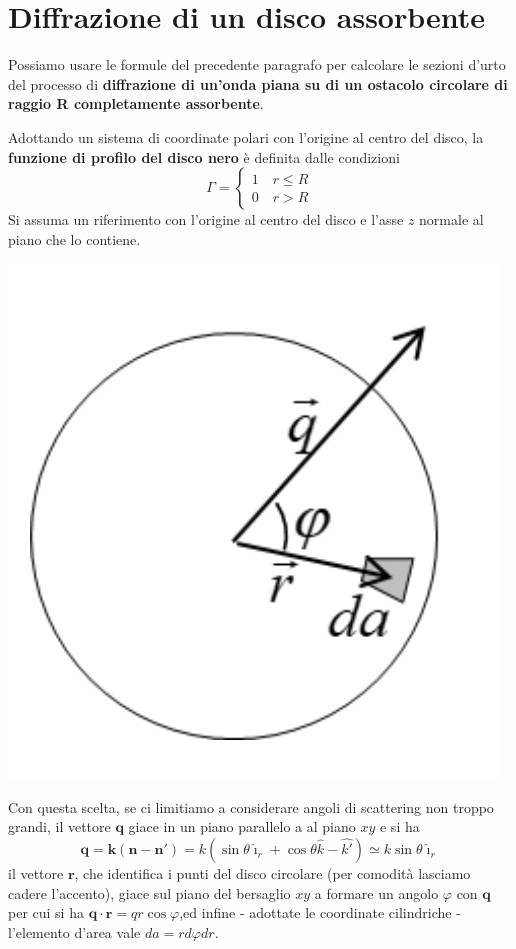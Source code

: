 \section{Diffrazione di un disco assorbente}\label{sec:diffrazione-di-un-disco-assorbente}

Possiamo usare le formule del precedente paragrafo per calcolare le
sezioni d'urto del processo di \textbf{diffrazione di un'onda piana su
di un ostacolo circolare di raggio R completamente assorbente}.

Adottando un sistema di coordinate polari con l'origine al centro del
disco, la \textbf{funzione di profilo del disco nero} è definita dalle
condizioni
\[
	\Gamma  =
	\begin{cases}
		1  \quad r \leq R \\
		0  \quad r > R
	\end{cases}
\]
Si assuma un riferimento con l'origine al centro del disco e l'asse $z$ normale al piano che lo contiene.
\begin{marginfigure}
	\centering
	\includegraphics{figs/schema-vett-trasferito-2}
	\label{fig:vett-trasferito2}
\end{marginfigure}
Con questa scelta, se ci limitiamo a considerare angoli di scattering non troppo grandi, il vettore $\bm{q}$ giace in un piano parallelo a al piano $xy$ e si ha \[
	\bm{q} = \bm{k} ( \bm{n} - \bm{n}') = k ( \sin \theta \hat{\imath}_r + \cos \theta \hat{k} - \hat{k'}) \simeq
	k \sin \theta \hat{\imath}_r
\]
il vettore \(\bm{r}\), che identifica i punti del disco circolare (per comodità lasciamo cadere l'accento),
giace sul piano del bersaglio \(xy\) a formare un angolo \(\varphi\) con \(\bm{q}\) per cui si ha
\(\bm{q} \cdot \bm{r} = qr \cos \varphi\),ed infine - adottate le coordinate cilindriche - l'elemento d'area vale
\(da = r d \varphi dr\).

